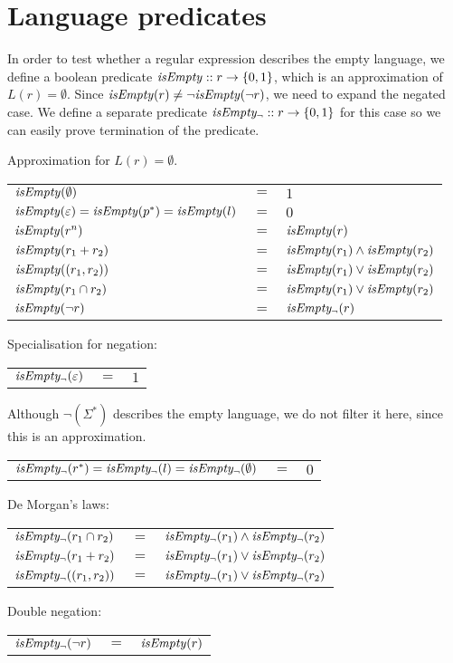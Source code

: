 \section{Language predicates}

In order to test whether a regular expression describes the empty language, we
define a boolean predicate $\mathit{isEmpty} :: r \to \{0, 1\}$, which is an
approximation of $L(r) = \emptyset$. Since $\mathit{isEmpty}(r) \neq \neg\mathit{isEmpty}(\neg
r)$, we need to expand the negated case. We define a separate predicate
$\mathit{isEmpty_\neg} :: r \to \{0, 1\}$ for this case so we can easily prove termination
of the predicate.

\needspace{5cm}

\begin{defn}
   Approximation for $L(r) = \emptyset$.

   \begin{tabular}{lll}
      $\mathit{isEmpty}(\emptyset)$	& $=$ & $1$ \\
      $\mathit{isEmpty}(\varepsilon) = \mathit{isEmpty}(p^*) = \mathit{isEmpty}(l)$
         & $=$ & $0$ \\
      $\mathit{isEmpty}(r^n)$		& $=$ & $\mathit{isEmpty}(r)$ \\
      $\mathit{isEmpty}(r_1 + r_2)$	& $=$ & $\mathit{isEmpty}(r_1) \wedge \mathit{isEmpty}(r_2)$ \\
      $\mathit{isEmpty}((r_1, r_2))$	& $=$ & $\mathit{isEmpty}(r_1) \vee \mathit{isEmpty}(r_2)$ \\
      $\mathit{isEmpty}(r_1 \cap r_2)$	& $=$ & $\mathit{isEmpty}(r_1) \vee \mathit{isEmpty}(r_2)$ \\
      $\mathit{isEmpty}(\neg r)$		& $=$ & $\mathit{isEmpty_\neg}(r)$ \\
   \end{tabular}

   Specialisation for negation:

   \begin{tabular}{lll}
      $\mathit{isEmpty_\neg}(\varepsilon)$	& $=$ & $1$ \\ 
   \end{tabular}

   Although $\neg(\Sigma^*)$ describes the empty language, we do not filter it
   here, since this is an approximation.

   \begin{tabular}{lll}
      $\mathit{isEmpty_\neg}(r^*) = \mathit{isEmpty_\neg}(l) = \mathit{isEmpty_\neg}(\emptyset)$	& $=$ & $0$ \\
   \end{tabular}

   De Morgan's laws:

   \begin{tabular}{lll}
      $\mathit{isEmpty_\neg}(r_1 \cap r_2)$	& $=$ & $\mathit{isEmpty_\neg}(r_1) \wedge \mathit{isEmpty_\neg}(r_2)$ \\
      $\mathit{isEmpty_\neg}(r_1 + r_2)$	& $=$ & $\mathit{isEmpty_\neg}(r_1) \vee \mathit{isEmpty_\neg}(r_2)$ \\
      $\mathit{isEmpty_\neg}((r_1, r_2))$	& $=$ & $\mathit{isEmpty_\neg}(r_1) \vee \mathit{isEmpty_\neg}(r_2)$ \\
   \end{tabular}

   Double negation:

   \begin{tabular}{lll}
      $\mathit{isEmpty_\neg}(\neg r)$	& $=$ & $\mathit{isEmpty}(r)$ \\
   \end{tabular}
\end{defn}


